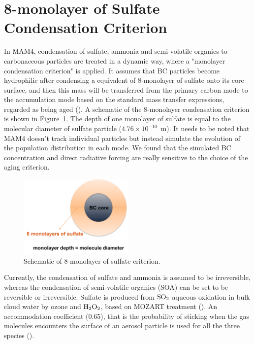 \documentclass[12pt, fullpage]{uiucthesis2009}
\begin{document}
	
	\section{8-monolayer of Sulfate Condensation Criterion}
		
	In MAM4, condensation of sulfate, ammonia and semi-volatile organics to carbonaceous particles are treated in a dynamic way, where a "monolayer condensation criterion" is applied. It assumes that BC particles become hydrophilic after condensing a equivalent of 8-monolayer of sulfate onto its core surface, and then this mass will be transferred from the primary carbon mode to the accumulation mode based on the standard mass transfer expressions, regarded as being aged (\cite{Liu2012}). A schematic of the 8-monolayer condensation criterion is shown in Figure~\ref{fig_P3}. The depth of one monolayer of sulfate is equal to the molecular diameter of sulfate particle ($4.76\times 10^{-10}$~m). It needs to be noted that MAM4 doesn't track individual particles but instead simulate the evolution of the population distribution in each mode. We found that the simulated BC concentration and direct radiative forcing are really sensitive to the choice of the aging criterion.
	\begin{figure}[h] 
		\begin{center}
			\includegraphics[width = 0.5\textwidth]{Figure03}
			\caption[Schematic of 8-monolayer of sulfate criterion]{\label{fig_P3} Schematic of 8-monolayer of sulfate criterion.}
		\end{center}
	\end{figure}
	
	Currently, the condensation of sulfate and ammonia is assumed to be irreversible, whereas the condensation of semi-volatile organics (SOA) can be set to be reversible or irreversible. Sulfate is produced from $\rm{SO}_{2}$ aqueous oxidation in bulk cloud water by ozone and $\rm{H}_{2}\rm{O}_{2}$, based on MOZART treatment (\cite{tie2001effects}). An accommodation coefficient (0.65), that is the probability of sticking when the gas molecules encounters the surface of an aerosol particle is used for all the three species (\cite{Liu2012}). 
	
\end{document}
